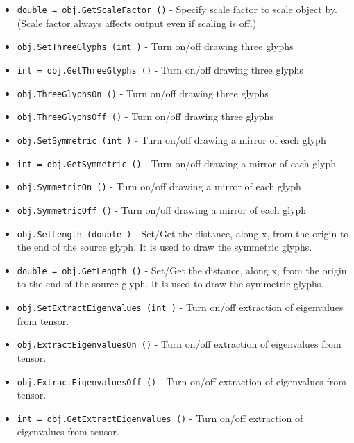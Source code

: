 \begin{itemize}
\item  \verb|double = obj.GetScaleFactor ()| -  Specify scale factor to scale object by. (Scale factor always affects
 output even if scaling is off.)

\item  \verb|obj.SetThreeGlyphs (int )| -  Turn on/off drawing three glyphs

\item  \verb|int = obj.GetThreeGlyphs ()| -  Turn on/off drawing three glyphs

\item  \verb|obj.ThreeGlyphsOn ()| -  Turn on/off drawing three glyphs

\item  \verb|obj.ThreeGlyphsOff ()| -  Turn on/off drawing three glyphs

\item  \verb|obj.SetSymmetric (int )| -  Turn on/off drawing a mirror of each glyph

\item  \verb|int = obj.GetSymmetric ()| -  Turn on/off drawing a mirror of each glyph

\item  \verb|obj.SymmetricOn ()| -  Turn on/off drawing a mirror of each glyph

\item  \verb|obj.SymmetricOff ()| -  Turn on/off drawing a mirror of each glyph

\item  \verb|obj.SetLength (double )| -  Set/Get the distance, along x, from the origin to the end of the 
 source glyph. It is used to draw the symmetric glyphs.

\item  \verb|double = obj.GetLength ()| -  Set/Get the distance, along x, from the origin to the end of the 
 source glyph. It is used to draw the symmetric glyphs.

\item  \verb|obj.SetExtractEigenvalues (int )| -  Turn on/off extraction of eigenvalues from tensor.

\item  \verb|obj.ExtractEigenvaluesOn ()| -  Turn on/off extraction of eigenvalues from tensor.

\item  \verb|obj.ExtractEigenvaluesOff ()| -  Turn on/off extraction of eigenvalues from tensor.

\item  \verb|int = obj.GetExtractEigenvalues ()| -  Turn on/off extraction of eigenvalues from tensor.


\end{itemize}
